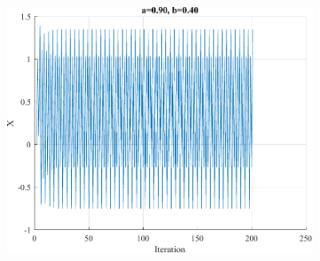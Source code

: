 \begin{figure}[htbp]
\begin{subfigure}{0.3\textwidth}
		\caption{}
	\end{subfigure}
	\begin{subfigure}{0.3\textwidth}
		\centering
		\includegraphics[width=\textwidth]{../Problem 3/prob3_(d)_a_0.90_b_0.40.pdf}
		\caption{}
	\end{subfigure}
	\caption{}
	\label{fig:prob3_d_multiple_a}
\end{figure}
